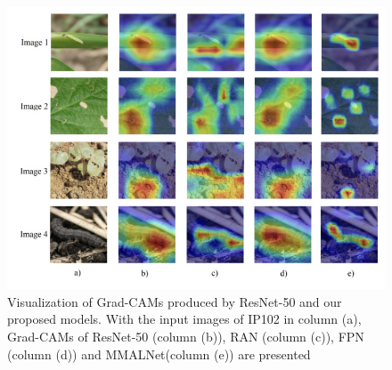 \begin{figure}
    \centering
    \includegraphics[scale=0.8]{figures/grad_cams.png}
    \caption{Visualization of Grad-CAMs produced by ResNet-50 and our
proposed models. With the input images of IP102 in column (a),
Grad-CAMs of ResNet-50 (column (b)), RAN (column (c)), FPN
(column (d)) and MMALNet(column (e)) are presented \cite{ung2021efficient} }
    \label{fig:my_label}
\end{figure}

